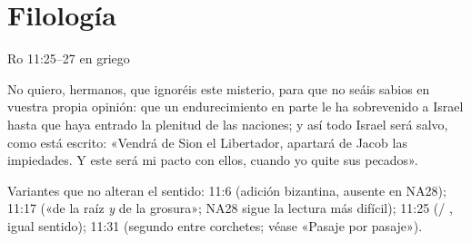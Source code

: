 \section{Filología}
\begin{frame}{Ro 11:25--27 en griego}
\begin{cita}[fontupper=\upshape\small]\end{cita}
\begin{cita}[fontupper=\scriptsize\itshape]No quiero, hermanos, que ignoréis este misterio, para que no seáis sabios en vuestra propia opinión: que un endurecimiento en parte le ha sobrevenido a Israel hasta que haya entrado la plenitud de las naciones; y así todo Israel será salvo, como está escrito: «Vendrá de Sion el Libertador, apartará de Jacob las impiedades. Y este será mi pacto con ellos, cuando yo quite sus pecados».\end{cita}
\begin{notalam}
Variantes que no alteran el sentido: 11:6 (adición bizantina, ausente en NA28); 11:17 («de la raíz \emph{y} de la grosura»; NA28 sigue la lectura más difícil); 11:25 (/ , igual sentido); 11:31 (segundo  entre corchetes; véase «Pasaje por pasaje»).
\end{notalam}
\end{frame}

